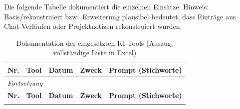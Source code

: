 Die folgende Tabelle dokumentiert die einzelnen Einsätze. Hinweis:
\glqq Basis/rekonstruiert\grqq{} bzw.\ \glqq Erweiterung plausibel\grqq{}
bedeutet, dass Einträge aus Chat-Verläufen oder Projektnotizen rekonstruiert
wurden.

\small
\sloppy
\renewcommand{\arraystretch}{1.4}
\begin{longtable}{|r|l|c|p{3.2cm}|>{\raggedright\arraybackslash}p{7.5cm}|}
\caption{Dokumentation der eingesetzten KI-Tools (Auszug; vollständige Liste in Excel)} \\
\hline
\textbf{Nr.} & \textbf{Tool} & \textbf{Datum} & \textbf{Zweck} & \textbf{Prompt (Stichworte)} \\
\hline
\endfirsthead

\multicolumn{5}{l}{\textit{Fortsetzung}} \\
\hline
\textbf{Nr.} & \textbf{Tool} & \textbf{Datum} & \textbf{Zweck} & \textbf{Prompt (Stichworte)} \\
\hline
\endhead

\hline
\endfoot


\end{longtable}
\normalsize
